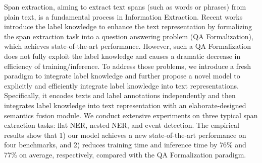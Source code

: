 Span extraction, aiming to extract text spans (such as words or phrases) from plain text, is a fundamental process in Information Extraction. Recent works introduce the label knowledge to enhance the text representation by formalizing the span extraction task into a question answering problem (QA Formalization), which achieves state-of-the-art performance. However, such a QA Formalization does not fully exploit the label knowledge and causes a dramatic decrease in efficiency of training/inference. To address those problems, we introduce a fresh paradigm to integrate label knowledge and further propose a novel model to explicitly and efficiently integrate label knowledge into text representations. Specifically, it encodes texts and label annotations independently and then integrates label knowledge into text representation with an elaborate-designed semantics fusion module. We conduct extensive experiments on three typical span extraction tasks: flat NER, nested NER, and event detection. The empirical results show that 1) our model achieves a new state-of-the-art performance on four benchmarks, and 2) reduces training time and inference time by 76\% and 77\% on average, respectively, compared with the QA Formalization paradigm.
